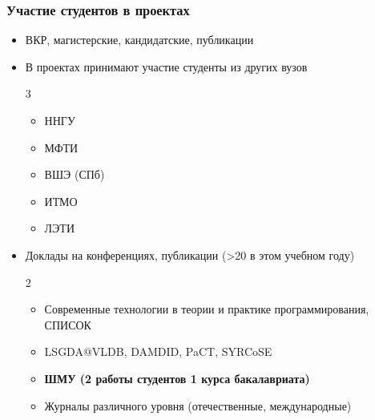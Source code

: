 \documentclass[xcolor=table,aspectratio=169]{beamer}
\begin{document}
\begin{frame}[fragile]
  \frametitle{Участие студентов в проектах}
  \begin{itemize}
      \item ВКР, магистерские, кандидатские, публикации
      \item В проектах принимают участие студенты из других вузов
      \begin{multicols}{3}
      \begin{itemize}
        \item ННГУ
        \item МФТИ
        \item ВШЭ (СПб)
        \item ИТМО
        \item ЛЭТИ
      \end{itemize}
      \end{multicols}
      \item Доклады на конференциях, публикации (>20 в этом учебном году)
      \begin{multicols}{2}
      \begin{itemize}
        \item Современные технологии в теории и практике программирования, СПИСОК
        \item LSGDA@VLDB, DAMDID, PaCT, SYRCoSE
        \item \textbf{ШМУ (2 работы студентов 1 курса бакалавриата)}
        \item Журналы различного уровня (отечественные, международные)
      \end{itemize}
      \end{multicols}
  \end{itemize} 
\end{frame}
\end{document}
